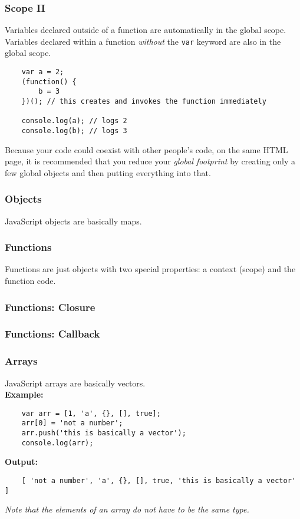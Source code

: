 \documentclass{lug}
\begin{document}
\begin{frame}[fragile]
    \frametitle{Scope II}

    Variables declared outside of a function are automatically in the global scope.\\

    Variables declared within a function \textit{without} the \texttt{var} keyword are also in the
    global scope.

    \begin{lstlisting}
    var a = 2;
    (function() {
        b = 3
    })(); // this creates and invokes the function immediately

    console.log(a); // logs 2
    console.log(b); // logs 3
    \end{lstlisting}

    Because your code could coexist with other people's code, on the same HTML page, it is
    recommended that you reduce your \textit{global footprint} by creating only a few global objects
    and then putting everything into that.
\end{frame}

\begin{frame}
    \frametitle{Objects}

    JavaScript objects are basically maps.

\end{frame}

\begin{frame}
    \frametitle{Functions}

    Functions are just objects with two special properties: a context (scope) and the function code.
\end{frame}

\begin{frame}
    \frametitle{Functions: Closure}

\end{frame}

\begin{frame}
    \frametitle{Functions: Callback}
\end{frame}

\begin{frame}[fragile]
    \frametitle{Arrays}

    JavaScript arrays are basically vectors.\\

    \textbf{Example:}

    \begin{lstlisting}
    var arr = [1, 'a', {}, [], true];
    arr[0] = 'not a number';
    arr.push('this is basically a vector');
    console.log(arr);
    \end{lstlisting}

    \textbf{Output:}

    \begin{lstlisting}
    [ 'not a number', 'a', {}, [], true, 'this is basically a vector' ]
    \end{lstlisting}

    \textit{Note that the elements of an array do not have to be the same type.}

\end{frame}
\end{document}
